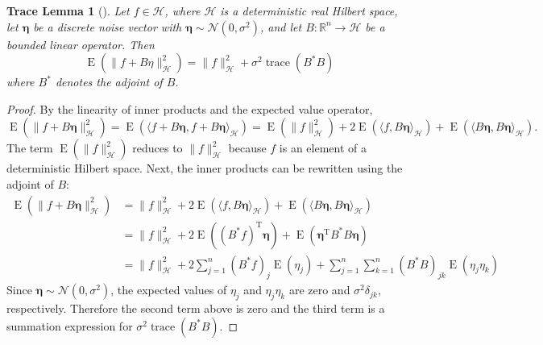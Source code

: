 \documentclass[12pt,notitlepage]{report}
\newcommand{\trans}{\mathrm{T}}	%
\DeclareMathOperator{\trace}{trace}		%
\newcommand{\noise}{\eta}	%
\newcommand{\noiseSD}{\sigma}	%
\newcommand{\noiseVec}{\bm{\noise}}	%
\DeclareMathOperator{\E}{E}	%
\newtheorem*{TL}{Trace Lemma}
\begin{document}
\begin{TL}[{{\cite[p.~98]{Vogel:2002}}}]
Let $f \in \mathcal{H}$, where $\mathcal{H}$ is a deterministic real Hilbert space, let $\noiseVec$ be a discrete noise vector with $\noiseVec \sim \mathcal{N}(0,\noiseSD^2)$, and let $B: \mathbb{R}^n \rightarrow \mathcal{H}$ be a bounded linear operator. Then
\[\E(\|f + B\noise\|_{\mathcal{H}}^2) = \|f\|_{\mathcal{H}}^2 + \noiseSD^2\trace({B^*}B)\]
where $B^*$ denotes the adjoint of $B$.
\end{TL}
\begin{proof}
By the linearity of inner products and the expected value operator,
\[\E(\|f + B\noiseVec\|_{\mathcal{H}}^2) = \E(\langle f + B\noiseVec, f + B\noiseVec\rangle_{\mathcal{H}}) = \E(\|f\|_{\mathcal{H}}^2) + 2\E(\langle f, B\noiseVec\rangle_{\mathcal{H}}) + \E(\langle B\noiseVec, B\noiseVec\rangle_{\mathcal{H}}).\]
The term $\E(\|f\|_{\mathcal{H}}^2)$ reduces to $\|f\|_{\mathcal{H}}^2$ because $f$ is an element of a deterministic Hilbert space. Next, the inner products can be rewritten using the adjoint of $B$:
\begin{align*}
\E(\|f + B\noiseVec\|_{\mathcal{H}}^2) &= \|f\|_{\mathcal{H}}^2 + 2\E(\langle f, B\noiseVec\rangle_{\mathcal{H}}) + \E(\langle B\noiseVec, B\noiseVec\rangle_{\mathcal{H}}) \\
&= \|f\|_{\mathcal{H}}^2 + 2\E(({B^*}f)^\trans\noiseVec) + \E({\noiseVec^\trans}{B^*}B\noiseVec) \\
&= \|f\|_{\mathcal{H}}^2 + 2\sum_{j=1}^n ({B^*}f)_j \E(\noise_j) + \sum_{j=1}^n\sum_{k=1}^n ({B^*}B)_{jk} \E({\noise_j}{\noise_k})
\end{align*}
Since $\noiseVec \sim \mathcal{N}(0,\noiseSD^2)$, the expected values of $\noise_j$ and ${\noise_j}{\noise_k}$ are zero and $\noiseSD^2\delta_{jk}$, respectively. Therefore the second term above is zero and the third term is a summation expression for $\noiseSD^2\trace({B^*}B)$.
\end{proof}
\end{document}
